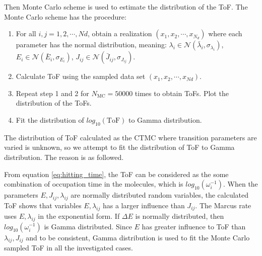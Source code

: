 \documentclass[letterpaper,12pt]{article}
\begin{document}
Then Monte Carlo scheme is used to estimate the distribution of the ToF. The Monte Carlo scheme has the procedure:
\begin{enumerate}
\item For all $i,j=1,2,\cdots, Nd$, obtain a realization $(x_1, x_2, \cdots, x_{N_d})$ where each parameter has the normal distribution, meaning: $\lambda_i \in \mathcal{N}(\bar{\lambda}_i, \sigma_{\lambda_i})$, $E_i \in \mathcal{N}(\bar{E}_i, \sigma_{E_i})$, $J_{ij} \in \mathcal{N}(\bar{J}_{ij}, \sigma_{J_{ij}})$. 
\item Calculate ToF using the sampled data set $(x_1, x_2, \cdots, x_{Nd})$. 
\item Repeat step 1 and 2 for $N_\text{MC} = 50000$ times to obtain ToFs. Plot the distribution of the ToFs.
\item Fit the distribution of $log_{10}(\text{ToF})$ to Gamma distribution.
\end{enumerate}

The distribution of ToF calculated as the CTMC where transition parameters are varied is unknown, so we attempt to fit the distribution of ToF to Gamma distribution. The reason is as followed.

From equation \ref{eq:hitting_time}, the ToF can be considered as the some combination of occupation time in the molecules, which is $log_{10}(\omega_{i}^{-1})$. 
When the parameters $E, J_{ij}, \lambda_{ij}$ are normally distributed random variables, the calculated ToF shows that variables $E,\lambda_{ij}$ has a larger influence than $J_{ij}$. 
The Marcus rate uses $E,\lambda_{ij}$ in the exponential form. If $\Delta E$ is normally distributed, then $log_{10}(\omega_{i}^{-1})$ is Gamma distributed. 
Since $E$ has greater influence to ToF than $\lambda_{ij}, J_{ij}$ and to be consistent, Gamma distribution is used to fit the Monte Carlo sampled ToF in all the investigated cases.
\end{document}
